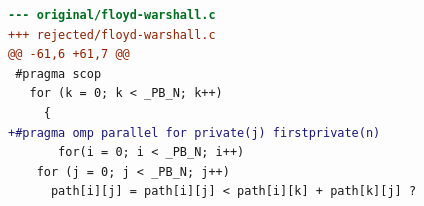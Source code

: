 \begin{lstlisting}[language=diff,basicstyle=\ttfamily\scriptsize,breaklines=true,caption={polybench/floyd-warshall — attempt 1 of 2, rejected by the gate at 'tsan': Race detected: / WARNING: ThreadSanitizer: data race (pid=2065293)}]
--- original/floyd-warshall.c
+++ rejected/floyd-warshall.c
@@ -61,6 +61,7 @@
 #pragma scop
   for (k = 0; k < _PB_N; k++)
     {
+#pragma omp parallel for private(j) firstprivate(n)
       for(i = 0; i < _PB_N; i++)
 	for (j = 0; j < _PB_N; j++)
 	  path[i][j] = path[i][j] < path[i][k] + path[k][j] ?
\end{lstlisting}
